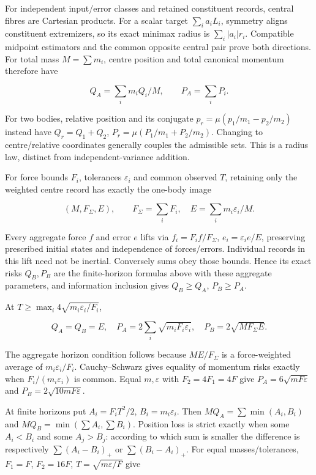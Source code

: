 \documentclass[11pt,a4paper]{article}
\begin{document}
For independent input/error classes and retained constituent records,
central fibres are Cartesian products. For a scalar target
\(\sum_i a_iL_i\), symmetry aligns constituent extremizers, so its exact
minimax radius is \(\sum_i|a_i|r_i\). Compatible midpoint estimators and
the common opposite central pair prove both directions. For total mass
\(M=\sum m_i\), centre position and total canonical momentum therefore
have

\[Q_A=\sum_i m_iQ_i/M,\qquad P_A=\sum_iP_i.\]

For two bodies, relative position and its conjugate
\(p_r=\mu(p_1/m_1-p_2/m_2)\) instead have \(Q_r=Q_1+Q_2\),
\(P_r=\mu(P_1/m_1+P_2/m_2)\). Changing to centre/relative coordinates
generally couples the admissible sets. This is a radius law, distinct
from independent-variance addition.

For force bounds \(F_i\), tolerances \(\varepsilon_i\) and common
observed \(T\), retaining only the weighted centre record has exactly
the one-body image

\[(M,F_\Sigma,E),\qquad F_\Sigma=\sum_iF_i,
\quad E=\sum_i m_i\varepsilon_i/M.\]

Every aggregate force \(f\) and error \(e\) lifts via
\(f_i=F_if/F_\Sigma\), \(e_i=\varepsilon_i e/E\), preserving prescribed
initial states and independence of forces/errors. Individual records in
this lift need not be inertial. Conversely sums obey those bounds. Hence
its exact risks \(Q_B,P_B\) are the finite-horizon formulas above with
these aggregate parameters, and information inclusion gives
\(Q_B\ge Q_A\), \(P_B\ge P_A\).

At \(T\ge\max_i4\sqrt{m_i\varepsilon_i/F_i}\),

\[Q_A=Q_B=E,\quad P_A=2\sum_i\sqrt{m_iF_i\varepsilon_i},
\quad P_B=2\sqrt{MF_\Sigma E}.\]

The aggregate horizon condition follows because \(ME/F_\Sigma\) is a
force-weighted average of \(m_i\varepsilon_i/F_i\). Cauchy--Schwarz
gives equality of momentum risks exactly when \(F_i/(m_i\varepsilon_i)\)
is common. Equal \(m,\varepsilon\) with \(F_2=4F_1=4F\) give
\(P_A=6\sqrt{mF\varepsilon}\) and \(P_B=2\sqrt{10mF\varepsilon}\).

At finite horizons put \(A_i=F_iT^2/2\), \(B_i=m_i\varepsilon_i\). Then
\(MQ_A=\sum\min(A_i,B_i)\) and \(MQ_B=\min(\sum A_i,\sum B_i)\).
Position loss is strict exactly when some \(A_i<B_i\) and some
\(A_j>B_j\): according to which sum is smaller the difference is
respectively \(\sum(A_i-B_i)_+\) or \(\sum(B_i-A_i)_+\). For equal
masses/tolerances, \(F_1=F\), \(F_2=16F\), \(T=\sqrt{m\varepsilon/F}\)
give
\end{document}
